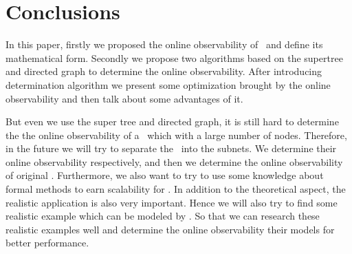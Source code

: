 \section{Conclusions}
\label{sec:con}

In this paper, firstly we proposed the online observability of \BCNs\ and define its mathematical form. Secondly we propose two algorithms based on the supertree and directed graph to determine the online observability. After introducing determination algorithm we present some optimization brought by the online observability and then talk about some advantages of it. %

But even we use the super tree and directed graph, it is still hard to determine the  the online observability of a \BCN\ which with a large number of nodes. Therefore, in the future we will try to separate the \BCN\ into the subnets. We determine their online observability respectively, and then we determine the online observability of original \BCN. Furthermore, we also want to try to use some knowledge about formal methods to earn scalability for \BCNs. In addition to the theoretical aspect, the realistic application is also very important. Hence we will also try to find some realistic example which can be modeled by \BCNs. So that we can research these realistic examples well and determine the online observability their models for better performance.